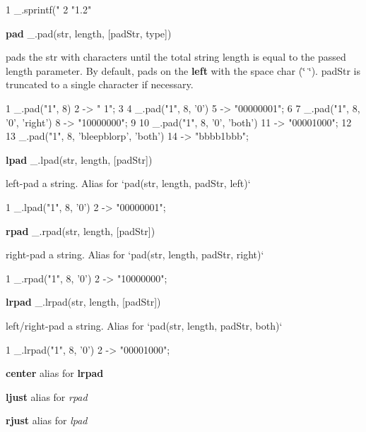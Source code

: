 \begin{DoxyCode}
1 \_.sprintf("%
2 "1.2"
\end{DoxyCode}


{\bfseries pad} \+\_\+.\+pad(str, length, \mbox{[}pad\+Str, type\mbox{]})

pads the {\ttfamily str} with characters until the total string length is equal to the passed {\ttfamily length} parameter. By default, pads on the {\bfseries left} with the space char ({\ttfamily \char`\"{} \char`\"{}}). {\ttfamily pad\+Str} is truncated to a single character if necessary.


\begin{DoxyCode}
1 \_.pad("1", 8)
2 -> "       1";
3 
4 \_.pad("1", 8, '0')
5 -> "00000001";
6 
7 \_.pad("1", 8, '0', 'right')
8 -> "10000000";
9 
10 \_.pad("1", 8, '0', 'both')
11 -> "00001000";
12 
13 \_.pad("1", 8, 'bleepblorp', 'both')
14 -> "bbbb1bbb";
\end{DoxyCode}


{\bfseries lpad} \+\_\+.\+lpad(str, length, \mbox{[}pad\+Str\mbox{]})

left-\/pad a string. Alias for `pad(str, length, pad\+Str, \textquotesingle{}left\textquotesingle{})`


\begin{DoxyCode}
1 \_.lpad("1", 8, '0')
2 -> "00000001";
\end{DoxyCode}


{\bfseries rpad} \+\_\+.\+rpad(str, length, \mbox{[}pad\+Str\mbox{]})

right-\/pad a string. Alias for `pad(str, length, pad\+Str, \textquotesingle{}right\textquotesingle{})`


\begin{DoxyCode}
1 \_.rpad("1", 8, '0')
2 -> "10000000";
\end{DoxyCode}


{\bfseries lrpad} \+\_\+.\+lrpad(str, length, \mbox{[}pad\+Str\mbox{]})

left/right-\/pad a string. Alias for `pad(str, length, pad\+Str, \textquotesingle{}both\textquotesingle{})`


\begin{DoxyCode}
1 \_.lrpad("1", 8, '0')
2 -> "00001000";
\end{DoxyCode}


{\bfseries center} alias for {\bfseries lrpad}

{\bfseries ljust} alias for {\itshape rpad}

{\bfseries rjust} alias for {\itshape lpad}

